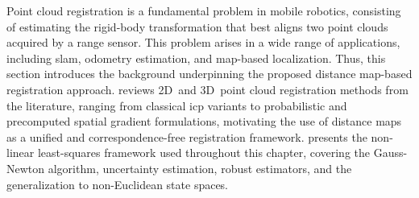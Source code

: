Point cloud registration is a fundamental problem in mobile robotics,
consisting of estimating the rigid-body transformation that best aligns
two point clouds acquired by a range sensor. This problem arises in a wide range
of applications, including \gls{slam}, odometry estimation, and map-based
localization. Thus, this section introduces the background underpinning
the proposed distance map-based registration approach.
 reviews 2D~and
3D~point cloud registration methods from the literature,
ranging from classical \gls{icp} variants to probabilistic and
precomputed spatial gradient formulations, motivating the use of
distance maps as a unified and correspondence-free registration framework.
 presents the
non-linear least-squares framework used throughout this chapter,
covering the Gauss-Newton algorithm, uncertainty estimation,
robust estimators, and the generalization to non-Euclidean state spaces.

